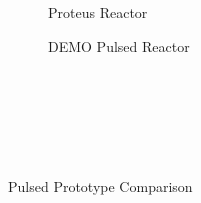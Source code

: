\begin{table}[b!]
\begin{subtable}[t]{0.5\textwidth}
\begin{tabular}{ c|c }
\end{tabular}
\end{subtable}
\hfill
\hfill
\label{table:charybdis}
\end{table}

\begin{figure*}[t!]
    \centering
    \hfill
    \begin{subfigure}[t]{0.45\textwidth}
        \centering
    \begin{adjustbox}{width=\textwidth}
      \Large
      
    \end{adjustbox}
        \caption{Proteus Reactor}
    \end{subfigure}
    \hfill
    \begin{subfigure}[t]{0.45\textwidth}
        \centering
    \begin{adjustbox}{width=\textwidth}
      \Large
      
    \end{adjustbox}
        \caption{DEMO Pulsed Reactor}
    \end{subfigure}
    \hfill \hfill ~\\ ~\\ ~\\
    \caption{Pulsed Prototype Comparison} ~\\
    \label{fig:proteus}
\end{figure*}

